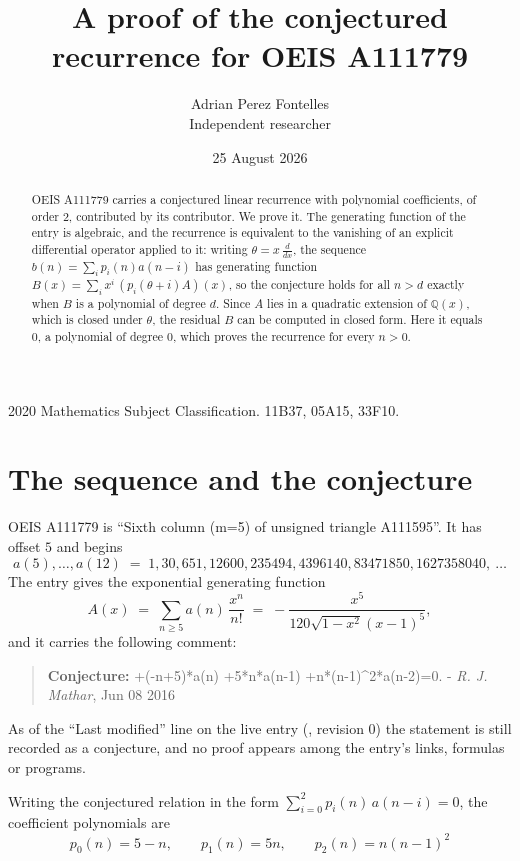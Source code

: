 \documentclass[11pt,a4paper]{article}
\title{A proof of the conjectured recurrence for OEIS A111779}
\author{Adrian Perez Fontelles\\ \small Independent researcher}
\date{25 August 2026}
\theoremstyle{plain}
\theoremstyle{definition}
\begin{document}
\maketitle

\begin{abstract}
OEIS A111779 carries a conjectured linear recurrence with polynomial coefficients, of
order 2, contributed by its contributor. We prove it. The generating function of the
entry is algebraic, and the recurrence is equivalent to the vanishing of an explicit
differential operator applied to it: writing $\theta=x\,\frac{d}{dx}$, the sequence
$b(n)=\sum_{i}p_{i}(n)a(n-i)$ has generating function
$B(x)=\sum_{i}x^{i}\,(p_{i}(\theta+i)A)(x)$, so the conjecture holds for all $n>d$ exactly
when $B$ is a polynomial of degree $d$. Since $A$ lies in a quadratic extension of
$\mathbb{Q}(x)$, which is closed under $\theta$, the residual $B$ can be computed in
closed form. Here it equals $0$, a polynomial of degree $0$, which proves
the recurrence for every $n>0$.
\end{abstract}

\noindent\small 2020 Mathematics Subject Classification. 11B37, 05A15, 33F10.\normalsize

\section{The sequence and the conjecture}

OEIS A111779 is ``Sixth column (m=5) of unsigned triangle A111595''. It has offset $5$ and begins
\[
a(5),\dots,a(12)\;=\;1, 30, 651, 12600, 235494, 4396140, 83471850, 1627358040,\ \dots
\]
The entry gives the exponential generating function
\begin{equation}\label{eq:gf}
A(x)\;=\;\sum_{n\ge 5} a(n)\,\frac{x^{n}}{n!}\;=\;- \frac{x^{5}}{120 \sqrt{1 - x^{2}} \left(x - 1\right)^{5}} ,
\end{equation}
and it carries the following comment:
\begin{quote}\small
\textbf{Conjecture:} +(-n+5)*a(n) +5*n*a(n-1) +n*(n-1)\^{}2*a(n-2)=0. - \emph{R. J. Mathar}, Jun 08 2016
\end{quote}
As of the ``Last modified'' line on the live entry (, revision 0) the
statement is still recorded as a conjecture, and no proof appears among the entry's links,
formulas or programs.

Writing the conjectured relation in the form $\sum_{i=0}^{2}p_{i}(n)\,a(n-i)=0$,
the coefficient polynomials are
\[
p_{0}(n)=5 - n,\qquad p_{1}(n)=5 n,\qquad p_{2}(n)=n \left(n - 1\right)^{2}
\]
\end{document}
